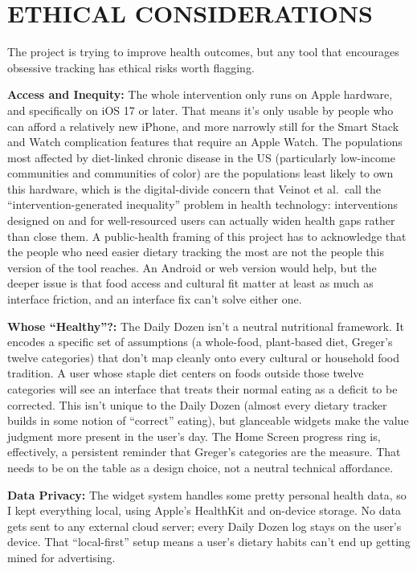 \documentclass[10pt,twocolumn]{article}
\begin{document}
\section{ETHICAL CONSIDERATIONS}

The project is trying to improve health outcomes, but any tool that encourages obsessive tracking has ethical risks worth flagging.

\noindent\textbf{Access and Inequity:} The whole intervention only runs on Apple hardware, and specifically on iOS 17 or later. That means it's only usable by people who can afford a relatively new iPhone, and more narrowly still for the Smart Stack and Watch complication features that require an Apple Watch. The populations most affected by diet-linked chronic disease in the US (particularly low-income communities and communities of color) are the populations least likely to own this hardware, which is the digital-divide concern that Veinot et al.\ call the ``intervention-generated inequality'' problem in health technology: interventions designed on and for well-resourced users can actually widen health gaps rather than close them.\cite{VeinotGoodIntentions} A public-health framing of this project has to acknowledge that the people who need easier dietary tracking the most are not the people this version of the tool reaches. An Android or web version would help, but the deeper issue is that food access and cultural fit matter at least as much as interface friction, and an interface fix can't solve either one.

\noindent\textbf{Whose ``Healthy''?:} The Daily Dozen isn't a neutral nutritional framework. It encodes a specific set of assumptions (a whole-food, plant-based diet, Greger's twelve categories) that don't map cleanly onto every cultural or household food tradition. A user whose staple diet centers on foods outside those twelve categories will see an interface that treats their normal eating as a deficit to be corrected. This isn't unique to the Daily Dozen (almost every dietary tracker builds in some notion of ``correct'' eating), but glanceable widgets make the value judgment more present in the user's day. The Home Screen progress ring is, effectively, a persistent reminder that Greger's categories are the measure. That needs to be on the table as a design choice, not a neutral technical affordance.

\noindent\textbf{Data Privacy:} The widget system handles some pretty personal health data, so I kept everything local, using Apple's HealthKit and on-device storage.\cite{AppleHIGWidgets} No data gets sent to any external cloud server; every Daily Dozen log stays on the user's device. That ``local-first'' setup means a user's dietary habits can't end up getting mined for advertising.
\end{document}
